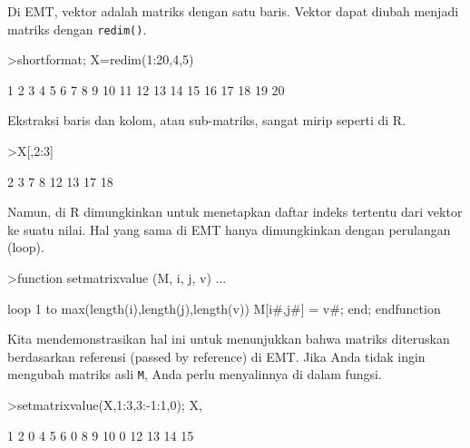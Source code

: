 \documentclass[a4paper,11pt,oneside,enabledeprecatedfontcommands]{scrbook}
\newenvironment{eulernotebook}{}{}
\newenvironment{eulercomment}{\par\medskip\noindent}{\par\medskip}
\begin{document}
\begin{eulernotebook}
\begin{eulercomment}
			Di EMT, vektor adalah matriks dengan satu baris. Vektor dapat diubah menjadi matriks dengan \texttt{redim()}.
		\end{eulercomment}
		\begin{eulerprompt}
			>shortformat; X=redim(1:20,4,5)
		\end{eulerprompt}
		\begin{euleroutput}
			        1         2         3         4         5 
			        6         7         8         9        10 
			       11        12        13        14        15 
			       16        17        18        19        20 
		\end{euleroutput}
		\begin{eulercomment}
			Ekstraksi baris dan kolom, atau sub-matriks, sangat mirip seperti di R.
		\end{eulercomment}
		\begin{eulerprompt}
			>X[,2:3]
		\end{eulerprompt}
		\begin{euleroutput}
			        2         3 
			        7         8 
			       12        13 
			       17        18 
		\end{euleroutput}
		\begin{eulercomment}
			Namun, di R dimungkinkan untuk menetapkan daftar indeks tertentu dari vektor ke suatu nilai. Hal yang
			sama di EMT hanya dimungkinkan dengan perulangan (loop).
		\end{eulercomment}
		\begin{eulerprompt}
			>function setmatrixvalue (M, i, j, v) ...
		\end{eulerprompt}
		\begin{eulerudf}
			loop 1 to max(length(i),length(j),length(v))
			   M[i{#},j{#}] = v{#};
			end;
			endfunction
		\end{eulerudf}
		\begin{eulercomment}
			Kita mendemonstrasikan hal ini untuk menunjukkan bahwa matriks diteruskan berdasarkan referensi
			(passed by reference) di EMT. Jika Anda tidak ingin mengubah matriks asli \texttt{M}, Anda perlu menyalinnya
			di dalam fungsi.
		\end{eulercomment}
		\begin{eulerprompt}
			>setmatrixvalue(X,1:3,3:-1:1,0); X,
		\end{eulerprompt}
		\begin{euleroutput}
			        1         2         0         4         5 
			        6         0         8         9        10 
			        0        12        13        14        15 

\end{euleroutput}
\end{eulernotebook}
\end{document}
